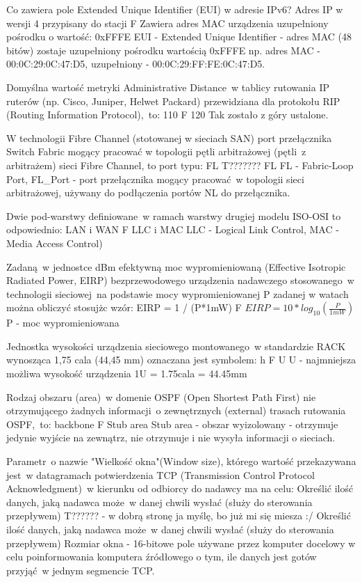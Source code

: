 \answer
{Co zawiera pole Extended Unique Identifier (EUI) w adresie IPv6?}
{Adres IP w wersji 4 przypisany do stacji}
{F}
{Zawiera adres MAC urządzenia uzupełniony pośrodku o wartość: 0xFFFE}
{EUI - Extended Unique Identifier - adres MAC (48 bitów) zostaje uzupełniony pośrodku wartością 0xFFFE np. adres MAC - 00:0C:29:0C:47:D5, uzupełniony - 00:0C:29:FF:FE:0C:47:D5.}

\answer
{Domyślna wartość metryki Administrative Distance~w tablicy rutowania IP ruterów (np. Cisco, Juniper, Helwet Packard) przewidziana dla protokołu RIP (Routing Information Protocol),~to:}
{110}
{F}
{120}
{Tak zostało z góry ustalone.}

\answer
{W technologii Fibre Channel (stotowanej w sieciach SAN) port przełącznika Switch Fabric mogący pracować w topologii pętli arbitrażowej (pętli~z arbitrażem) sieci Fibre Channel, to port typu:}
{FL}
{T???????}
{FL}
{FL - Fabric-Loop Port, FL\_Port - port przełącznika mogący pracować~w topologii sieci arbitrażowej, używany do podłączenia portów NL do przełącznika.}

\answer
{Dwie pod-warstwy definiowane~w ramach warstwy drugiej modelu ISO-OSI to odpowiednio:}
{LAN i WAN}
{F}
{LLC i MAC}
{LLC - Logical Link Control, MAC - Media Access Control)}

\answer
{Zadaną~w jednostce dBm efektywną moc wypromieniowaną (Effective Isotropic Radiated Power, EIRP) bezprzewodowego urządzenia nadawczego stosowanego~w technologii sieciowej~na podstawie mocy wypromieniowanej P zadanej w watach można obliczyć stosujżc wzór:}
{EIRP = 1 / (P*1mW)}
{F}
{$EIRP = 10*log_{10}(\frac{P}{1mW})$}
{P - moc wypromieniowana}

\answer
{Jednostka wysokości urządzenia sieciowego montowanego~w standardzie RACK wynosząca 1,75 cala (44,45 mm) oznaczana jest symbolem:}
{h}
{F}
{U}
{U - najmniejsza możliwa wysokość urządzenia 1U = 1.75cala = 44.45mm}

\answer
{Rodzaj obszaru (area)~w domenie OSPF (Open Shortest Path First) nie otrzymującego żadnych informacji~o zewnętrznych (external) trasach rutowania OSPF,~to:}
{backbone}
{F}
{Stub area}
{Stub area - obszar wyizolowany - otrzymuje jedynie wyjście na zewnątrz, nie otrzymuje i nie wysyła informacji o sieciach.}

\answer
{Parametr~o nazwie "Wielkość okna"(Window size), którego wartość przekazywana jest~w datagramach potwierdzenia TCP (Transmission Control Protocol Acknowledgment)~w kierunku od odbiorcy do nadawcy ma na celu:}
{Określić ilość danych, jaką nadawca może~w danej chwili wysłać (służy do sterowania przepływem)}
{T?????? - w dobrą stronę ja myślę, bo już mi się miesza :/}
{Określić ilość danych, jaką nadawca może~w danej chwili wysłać (służy do sterowania przepływem)}
{Rozmiar okna - 16-bitowe pole używane przez komputer docelowy w celu poinformowania komputera źródłowego o tym, ile danych jest gotów przyjąć~w jednym segmencie TCP.}

